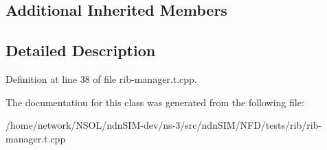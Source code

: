 \subsection*{Additional Inherited Members}


\subsection{Detailed Description}


Definition at line 38 of file rib-\/manager.\+t.\+cpp.



The documentation for this class was generated from the following file\+:\begin{DoxyCompactItemize}
\item 
/home/network/\+N\+S\+O\+L/ndn\+S\+I\+M-\/dev/ns-\/3/src/ndn\+S\+I\+M/\+N\+F\+D/tests/rib/rib-\/manager.\+t.\+cpp\end{DoxyCompactItemize}
